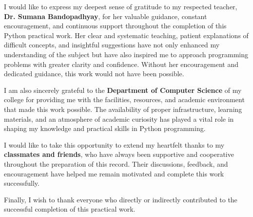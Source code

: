 {
I would like to express my deepest sense of gratitude to my respected teacher, 
\textbf{Dr. Sumana Bandopadhyay}, for her valuable guidance, constant encouragement, 
and continuous support throughout the completion of this Python practical work. 
Her clear and systematic teaching, patient explanations of difficult concepts, and 
insightful suggestions have not only enhanced my understanding of the subject but 
have also inspired me to approach programming problems with greater clarity and confidence.  
Without her encouragement and dedicated guidance, this work would not have been possible.  

I am also sincerely grateful to the \textbf{Department of Computer Science} of my 
college for providing me with the facilities, resources, and academic environment 
that made this work possible. The availability of proper infrastructure, learning 
materials, and an atmosphere of academic curiosity has played a vital role in 
shaping my knowledge and practical skills in Python programming.  

I would like to take this opportunity to extend my heartfelt thanks to my 
\textbf{classmates and friends}, who have always been supportive and cooperative 
throughout the preparation of this record. Their discussions, feedback, and 
encouragement have helped me remain motivated and complete this work successfully.  

Finally, I wish to thank everyone who directly or indirectly contributed to the 
successful completion of this practical work.
}